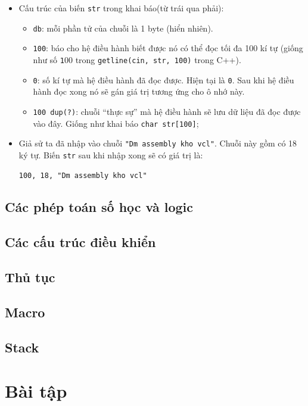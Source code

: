 \documentclass[12pt]{report}
\newcommand{\code}[1]{\texttt{#1}}
\begin{document}
\begin{itemize}
    \item Cấu trúc của biến \code{str} trong khai báo(từ trái qua phải):
    \begin{itemize}
        \item \code{db}: mỗi phần tử của chuỗi là 1 byte (hiển nhiên).
        \item \code{100}: báo cho hệ điều hành biết được nó có thể đọc tối đa 100 kí tự (giống như số \code 100 trong \code{getline(cin, str, 100)} trong C++).
        \item \code{0}: số kí tự mà hệ điều hành đã đọc được. Hiện tại là \code 0. Sau khi hệ điều hành đọc xong nó sẽ gán giá trị tương ứng cho ô nhớ này.
        \item \code{100 dup(?)}: chuỗi ``thực sự'' mà hệ điều hành sẽ lưu dữ liệu đã đọc được vào đây. Giống như khai báo \code{char str[100]};
    \end{itemize}
    \item Giả sử ta đã nhập vào chuỗi \code{"Dm assembly kho vcl"}. Chuỗi này gồm có 18 ký tự. Biến \code{str} sau khi nhập xong sẽ có giá trị là:
    \begin{verbatim}
100, 18, "Dm assembly kho vcl"
    \end{verbatim} 
\end{itemize}

\section{Các phép toán số học và logic}

\section{Các cấu trúc điều khiển}

\section{Thủ tục}

\section{Macro}

\section{Stack}

\chapter{Bài tập}

\renewcommand{\bibname}{Tài liệu tham khảo}


\end{document}
